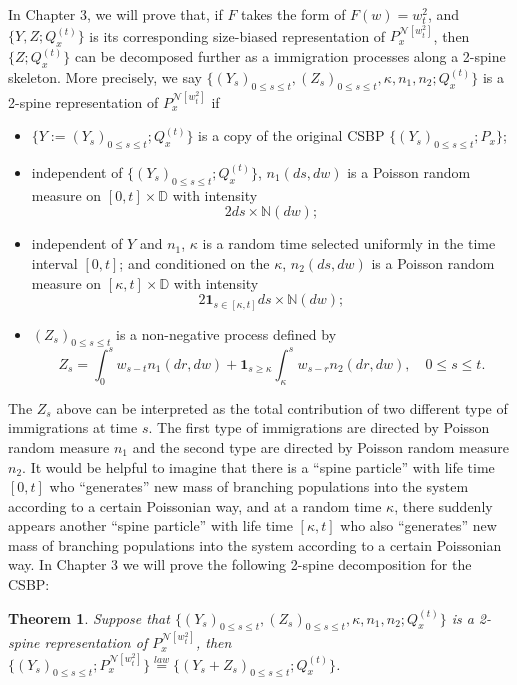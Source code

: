 \documentclass[UTF8]{pkuthss}
\theoremstyle{plain}
\newtheorem{thm}{Theorem}[section]
\theoremstyle{definition}
\numberwithin{equation}{section}
\begin{document}
	In Chapter 3, we will prove that, if $F$ takes the form of $F(w) = w_t^2$, and $\{Y,Z; Q_x^{(t)}\}$ is its corresponding size-biased representation of $P_x^{\mathcal N[w_t^2]}$, then $\{Z; Q_x^{(t)}\}$ can be decomposed further as a immigration processes along a 2-spine skeleton. More precisely, we say $\{(Y_s)_{0\leq s\leq t}, (Z_s)_{0\leq s\leq t}, \kappa, n_1, n_2; Q_x^{(t)}\}$ is a 2-spine representation of $P_x^{\mathcal N[w_t^2]}$ if
\begin{itemize}
\item
	$\{Y:=(Y_s)_{0\leq s\leq t}; Q_x^{(t)}\}$ is a copy of the original CSBP $\{(Y_s)_{0\leq s\leq t}; P_x\}$;
\item
	independent of $\{(Y_s)_{0\leq s\leq t}; Q_x^{(t)}\}$, $n_1(ds,dw)$ is a Poisson random measure on $[0,t]\times \mathbb D$ with intensity
\[
	2ds\times \mathbb N(dw);
\]
\item
	independent of $Y$ and $n_1$, $\kappa$ is a random time selected uniformly in the time interval $[0,t]$; and conditioned on the $\kappa$, $n_2(ds,dw)$ is a Poisson random measure on $[\kappa, t]\times \mathbb D$ with intensity
\[
	2\mathbf 1_{s\in [\kappa, t]}ds \times \mathbb N(dw);
\]
\item
	$(Z_s)_{0\leq s\leq t}$ is a non-negative process defined by
\[
	Z_s = \int_0^s w_{s-t} n_1(dr,dw) + \mathbf 1_{s\geq \kappa}\int_{\kappa}^s w_{s-r}n_2(dr,dw),\quad 0\leq s\leq t.
\]
\end{itemize}
	The $Z_s$ above can be interpreted as the total contribution of two different type of immigrations at time $s$. The first type of immigrations are directed by Poisson random measure $n_1$ and the second type are directed by Poisson random measure $n_2$. It would be helpful to imagine that there is a ``spine particle'' with life time $[0,t]$ who ``generates'' new mass of branching populations into the system according to a certain Poissonian way, and at a random time $\kappa$, there suddenly appears another ``spine particle'' with life time $[\kappa, t]$ who also ``generates'' new mass of branching populations into the system according to a certain Poissonian way. 
	In Chapter 3 we will prove the following 2-spine decomposition for the CSBP:
\begin{thm}
\label{thm: 2-spine decomposition for CSBP}
	Suppose that $\{(Y_s)_{0\leq s\leq t}, (Z_s)_{0\leq s\leq t}, \kappa, n_1, n_2; Q_x^{(t)}\}$ is a 2-spine representation of $P_x^{\mathcal N[w_t^2]}$, then $\{(Y_s)_{0\leq s\leq t}; P_x^{\mathcal N[w_t^2]}\}\overset{law}{=}\{(Y_s + Z_s)_{0\leq s\leq t}; Q_x^{(t)}\}$.
\end{thm}
	
\end{document}
